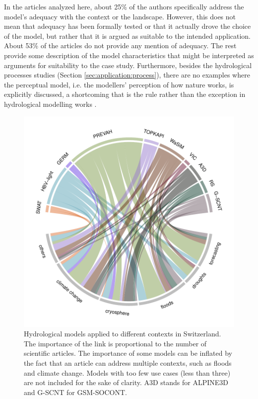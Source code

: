 \documentclass[10pt,a4paper]{article}
\begin{document}
In the articles analyzed here, about 25\% of the authors specifically address the model's adequacy with the context or the landscape. However, this does not mean that adequacy has been formally tested or that it actually drove the choice of the model, but rather that it is argued as suitable to the intended application. About 53\% of the articles do not provide any mention of adequacy. The rest provide some description of the model characteristics that might be interpreted as arguments for suitability to the case study. Furthermore, besides the hydrological processes studies (Section \ref{sec:application:process}), there are no examples where the perceptual model, i.e. the modellers' perception of how nature works, is explicitly discussed, a shortcoming that is the rule rather than the exception in hydrological modelling works \citep{beven2021}.

\begin{figure}[htb]
	\begin{center}
		\includegraphics[width=0.70\columnwidth]{figures/chord_diagram_contexts}
		\caption{{Hydrological models applied to different contexts in Switzerland. The importance of the link is proportional to the number of scientific articles. The importance of some models can be inflated by the fact that an article can address multiple contexts, such as floods and climate change. Models with too few use cases (less than three) are not included for the sake of clarity. A3D stands for ALPINE3D and G-SCNT for GSM-SOCONT. 
		{\label{fig:applications}}
		}}
	\end{center}
\end{figure}
\end{document}
